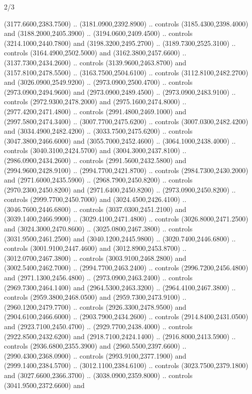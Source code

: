 \begin{flagdescription}{2/3}
\begin{scope}[shift={(0.5\flaglength,0.5)},scale=\flagwidth/130]
\begin{scope}[y=0.01mm, x=0.01mm,shift={(-3365,-2250)}]
  (3177.6600,2383.7500) .. (3181.0900,2392.8900) .. controls
  (3185.4300,2398.4000) and (3188.2000,2405.3900) .. (3194.0600,2409.4500) ..
  controls (3214.1000,2440.7800) and (3198.3200,2495.2700) ..
  (3189.7300,2525.3100) .. controls (3164.4900,2502.5000) and
  (3162.3800,2457.6600) .. (3137.7300,2434.2600) .. controls
  (3139.9600,2463.8700) and (3157.8100,2478.5500) .. (3163.7500,2504.6100) ..
  controls (3112.8100,2482.2700) and (3026.0900,2549.9200) ..
  (2973.0900,2500.4700) .. controls (2973.0900,2494.9600) and
  (2973.0900,2489.4500) .. (2973.0900,2483.9100) .. controls
  (2972.9300,2478.2000) and (2975.1600,2474.8000) .. (2977.4200,2471.4800) ..
  controls (2991.4800,2469.1000) and (2997.5800,2474.3400) ..
  (3007.7700,2475.6200) .. controls (3007.0300,2482.4200) and
  (3034.4900,2482.4200) .. (3033.7500,2475.6200) .. controls
  (3047.3800,2466.6000) and (3055.7000,2452.4600) .. (3064.1000,2438.4000) ..
  controls (3040.3100,2424.5700) and (3004.3000,2437.8100) ..
  (2986.0900,2434.2600) .. controls (2991.5600,2432.5800) and
  (2994.9600,2428.9100) .. (2994.7700,2421.8700) .. controls
  (2984.7300,2430.2000) and (2971.6000,2435.5900) .. (2968.7900,2450.8200) ..
  controls (2970.2300,2450.8200) and (2971.6400,2450.8200) ..
  (2973.0900,2450.8200) .. controls (2999.7700,2450.7000) and
  (3024.4500,2426.4100) .. (3046.7600,2446.6800) .. controls
  (3037.0300,2451.2100) and (3039.1400,2466.9900) .. (3029.4100,2471.4800) ..
  controls (3026.8000,2471.2500) and (3024.3000,2470.8600) ..
  (3025.0800,2467.3800) .. controls (3031.9500,2461.2500) and
  (3040.1200,2445.9800) .. (3020.7400,2446.6800) .. controls
  (3001.9100,2447.4600) and (3012.8900,2453.8700) .. (3012.0700,2467.3800) ..
  controls (3003.9100,2468.2800) and (3002.5400,2462.7000) ..
  (2994.7700,2463.2400) .. controls (2996.7200,2456.4800) and
  (2971.1300,2456.4800) .. (2973.0900,2463.2400) .. controls
  (2969.7300,2464.1400) and (2964.5300,2463.3200) .. (2964.4100,2467.3800) ..
  controls (2959.3800,2468.0500) and (2959.7300,2473.9100) ..
  (2960.1200,2479.7700) .. controls (2926.3300,2478.9500) and
  (2904.6100,2466.6000) .. (2903.7900,2434.2600) .. controls
  (2914.8400,2431.0500) and (2923.7100,2450.4700) .. (2929.7700,2438.4000) ..
  controls (2922.8500,2432.6200) and (2918.7100,2424.1400) ..
  (2916.8000,2413.5900) .. controls (2936.6800,2355.3900) and
  (2960.5500,2397.6600) .. (2990.4300,2368.0900) .. controls
  (2993.9100,2377.1900) and (2999.1400,2384.5700) .. (3012.1100,2384.6100) ..
  controls (3023.7500,2379.1800) and (3027.6600,2366.3700) ..
  (3038.0900,2359.8000) .. controls (3041.9500,2372.6600) and

\end{scope}
\end{scope}
\end{flagdescription}
